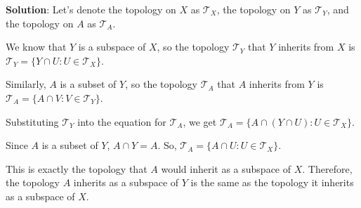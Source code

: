 \documentclass[
]{book}
\theoremstyle{definition}
\theoremstyle{definition}
\theoremstyle{definition}
\theoremstyle{definition}
\theoremstyle{remark}
\begin{document}
\textbf{Solution}:
Let's denote the topology on \(X\) as \(\mathcal{T}_X\), the topology on \(Y\) as \(\mathcal{T}_Y\), and the topology on \(A\) as \(\mathcal{T}_A\).

We know that \(Y\) is a subspace of \(X\), so the topology \(\mathcal{T}_Y\) that \(Y\) inherits from \(X\) is \(\mathcal{T}_Y = \{ Y \cap U : U \in \mathcal{T}_X \}\).

Similarly, \(A\) is a subset of \(Y\), so the topology \(\mathcal{T}_A\) that \(A\) inherits from \(Y\) is \(\mathcal{T}_A = \{ A \cap V : V \in \mathcal{T}_Y \}\).

Substituting \(\mathcal{T}_Y\) into the equation for \(\mathcal{T}_A\), we get \(\mathcal{T}_A = \{ A \cap (Y \cap U) : U \in \mathcal{T}_X \}\).

Since \(A\) is a subset of \(Y\), \(A \cap Y = A\). So, \(\mathcal{T}_A = \{ A \cap U : U \in \mathcal{T}_X \}\).

This is exactly the topology that \(A\) would inherit as a subspace of \(X\). Therefore, the topology \(A\) inherits as a subspace of \(Y\) is the same as the topology it inherits as a subspace of \(X\).

  
\end{document}
